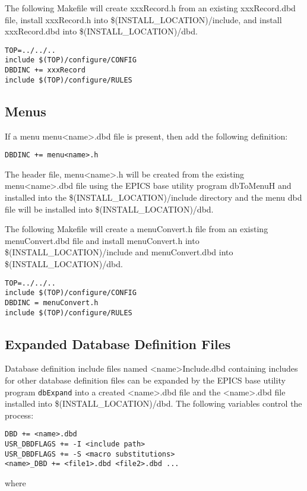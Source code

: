 The following Makefile will create xxxRecord.h from an existing xxxRecord.dbd file, install xxxRecord.h into 
\$(INSTALL\_LOCATION)/include, and install xxxRecord.dbd into \$(INSTALL\_LOCATION)/dbd.

\begin{verbatim}TOP=../../..
include $(TOP)/configure/CONFIG
DBDINC += xxxRecord
include $(TOP)/configure/RULES
\end{verbatim}\subsection{Menus}

If a menu menu\textless{}name\textgreater{}.dbd file is present, then add the following definition:

\begin{verbatim}DBDINC += menu<name>.h
\end{verbatim}The header file, menu\textless{}name\textgreater{}.h will be created from the existing menu\textless{}name\textgreater{}.dbd file using the EPICS base utility 
program dbToMenuH and installed into the \$(INSTALL\_LOCATION)/include directory and the menu dbd file will be 
installed into \$(INSTALL\_LOCATION)/dbd.

The following Makefile will create a menuConvert.h file from an existing menuConvert.dbd file and install 
menuConvert.h into \$(INSTALL\_LOCATION)/include and menuConvert.dbd into \$(INSTALL\_LOCATION)/dbd.

\begin{verbatim}TOP=../../..
include $(TOP)/configure/CONFIG
DBDINC = menuConvert.h
include $(TOP)/configure/RULES
\end{verbatim}\subsection{Expanded Database Definition Files}

Database definition include files named \textless{}name\textgreater{}Include.dbd containing includes for other database definition files can be 
expanded by the EPICS base utility program \verb|dbExpand| into a created \textless{}name\textgreater{}.dbd file and the \textless{}name\textgreater{}.dbd file installed 
into \$(INSTALL\_LOCATION)/dbd. The following variables control the process:

\begin{verbatim}DBD += <name>.dbd
USR_DBDFLAGS += -I <include path>
USR_DBDFLAGS += -S <macro substitutions>
<name>_DBD += <file1>.dbd <file2>.dbd ...
\end{verbatim}
where 

